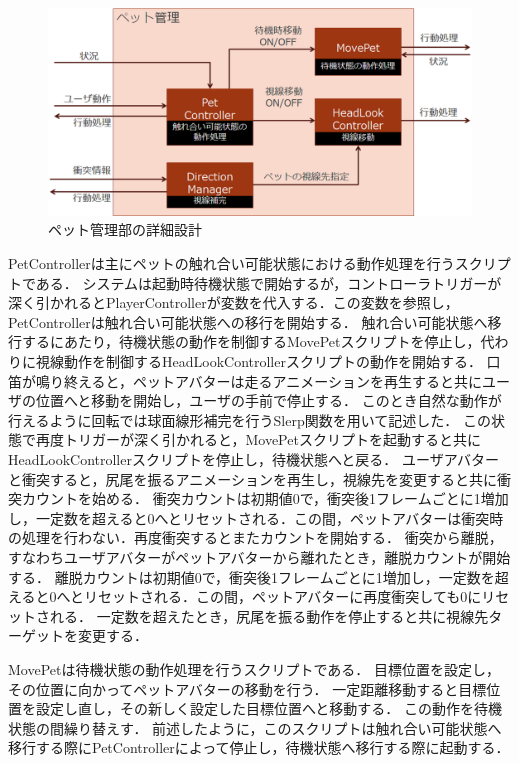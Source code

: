 \begin{figure}[H]
\centering
\includegraphics*[width=15cm,clip]{images/design4.eps}
\caption{ペット管理部の詳細設計}
\label{fig:design4}
\end{figure}

PetControllerは主にペットの触れ合い可能状態における動作処理を行うスクリプトである．
システムは起動時待機状態で開始するが，コントローラトリガーが深く引かれるとPlayerControllerが変数を代入する．この変数を参照し，PetControllerは触れ合い可能状態への移行を開始する．
触れ合い可能状態へ移行するにあたり，待機状態の動作を制御するMovePetスクリプトを停止し，代わりに視線動作を制御するHeadLookControllerスクリプトの動作を開始する．
口笛が鳴り終えると，ペットアバターは走るアニメーションを再生すると共にユーザの位置へと移動を開始し，ユーザの手前で停止する．
このとき自然な動作が行えるように回転では球面線形補完を行うSlerp関数を用いて記述した．
この状態で再度トリガーが深く引かれると，MovePetスクリプトを起動すると共にHeadLookControllerスクリプトを停止し，待機状態へと戻る．
ユーザアバターと衝突すると，尻尾を振るアニメーションを再生し，視線先を変更すると共に衝突カウントを始める．
衝突カウントは初期値0で，衝突後1フレームごとに1増加し，一定数を超えると0へとリセットされる．この間，ペットアバターは衝突時の処理を行わない．再度衝突するとまたカウントを開始する．
衝突から離脱，すなわちユーザアバターがペットアバターから離れたとき，離脱カウントが開始する．
離脱カウントは初期値0で，衝突後1フレームごとに1増加し，一定数を超えると0へとリセットされる．この間，ペットアバターに再度衝突しても0にリセットされる．
一定数を超えたとき，尻尾を振る動作を停止すると共に視線先ターゲットを変更する．

MovePetは待機状態の動作処理を行うスクリプトである．
目標位置を設定し，その位置に向かってペットアバターの移動を行う．
一定距離移動すると目標位置を設定し直し，その新しく設定した目標位置へと移動する．
この動作を待機状態の間繰り替えす．
前述したように，このスクリプトは触れ合い可能状態へ移行する際にPetControllerによって停止し，待機状態へ移行する際に起動する．


